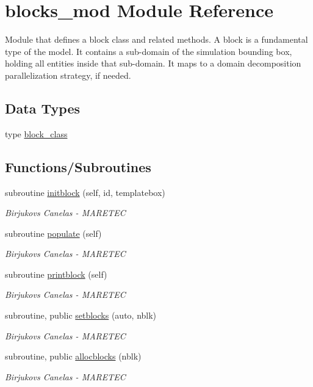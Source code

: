 \hypertarget{namespaceblocks__mod}{}\section{blocks\+\_\+mod Module Reference}
\label{namespaceblocks__mod}


Module that defines a block class and related methods. A block is a fundamental type of the model. It contains a sub-\/domain of the simulation bounding box, holding all entities inside that sub-\/domain. It maps to a domain decomposition parallelization strategy, if needed.  


\subsection*{Data Types}
\begin{DoxyCompactItemize}
\item 
type \hyperlink{structblocks__mod_1_1block__class}{block\+\_\+class}
\end{DoxyCompactItemize}
\subsection*{Functions/\+Subroutines}
\begin{DoxyCompactItemize}
\item 
subroutine \hyperlink{namespaceblocks__mod_a534ca69b17b6f54ee07f995b02feff39}{initblock} (self, id, templatebox)
\begin{DoxyCompactList}\small\item\em Birjukovs Canelas -\/ M\+A\+R\+E\+T\+EC \end{DoxyCompactList}\item 
subroutine \hyperlink{namespaceblocks__mod_a7585844eb1b43604c04cb7a24c56205e}{populate} (self)
\begin{DoxyCompactList}\small\item\em Birjukovs Canelas -\/ M\+A\+R\+E\+T\+EC \end{DoxyCompactList}\item 
subroutine \hyperlink{namespaceblocks__mod_a6eab8b323cb15dcecb5c6b0c31b4e246}{printblock} (self)
\begin{DoxyCompactList}\small\item\em Birjukovs Canelas -\/ M\+A\+R\+E\+T\+EC \end{DoxyCompactList}\item 
subroutine, public \hyperlink{namespaceblocks__mod_a3312d23e0268d67aaf99d579aa57d0e7}{setblocks} (auto, nblk)
\begin{DoxyCompactList}\small\item\em Birjukovs Canelas -\/ M\+A\+R\+E\+T\+EC \end{DoxyCompactList}\item 
subroutine, public \hyperlink{namespaceblocks__mod_a639beb0fee2290d46353f4b4702d6711}{allocblocks} (nblk)
\begin{DoxyCompactList}\small\item\em Birjukovs Canelas -\/ M\+A\+R\+E\+T\+EC \end{DoxyCompactList}\end{DoxyCompactItemize}
